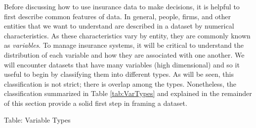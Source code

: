 \documentclass[]{book}
\begin{document}
Before discussing how to use insurance data to make decisions, it is
helpful to first describe common features of data. In general, people,
firms, and other entities that we want to understand are described in a
dataset by numerical characteristics. As these characteristics vary by
entity, they are commonly known as \emph{variables}. To manage insurance
systems, it will be critical to understand the distribution of each
variable and how they are associated with one another. We will encounter
datasets that have many variables (high dimensional) and so it useful to
begin by classifying them into different types. As will be seen, this
classification is not strict; there is overlap among the types.
Nonetheless, the classification summarized in Table \ref{tab:VarTypes}
and explained in the remainder of this section provide a solid first
step in framing a dataset.

Table: \label{tab:VarTypes} Variable Types
\end{document}
